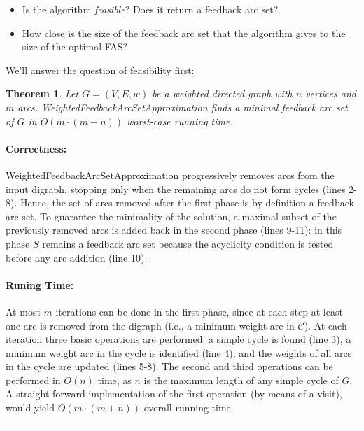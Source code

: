\documentclass{article}
\newtheorem{theorem}{Theorem}
\newenvironment{proof}{{\bf Proof:}}{\hfill\rule{2mm}{2mm}}
\begin{document}
\begin{itemize}
    \item Is the algorithm {\em feasible}? Does it return a feedback arc set?
    \item How close is the size of the feedback arc set that the algorithm gives to the size of the optimal FAS?
\end{itemize}

We'll answer the question of feasibility first:

\begin{theorem}
    Let $G = (V, E, w)$ be a weighted directed graph with $n$ vertices and $m$
arcs. {\sc WeightedFeedbackArcSetApproximation} finds a minimal feedback arc set of $G$ in $O(m\cdot (m+n))$ worst-case running time.  
\end{theorem}

\begin{proof}
\paragraph{Correctness:}
{\sc WeightedFeedbackArcSetApproximation} progressively removes arcs from the input digraph, stopping only when the remaining arcs do not form cycles (lines 2-8). Hence, the set of arcs removed after the first phase is by definition a feedback arc set. To guarantee the minimality of the solution, a maximal subset of the previously removed arcs is added back in the second phase (lines 9-11): in this phase $S$ remains a feedback arc set because the acyclicity condition is tested before any arc addition (line 10).

\paragraph{Runing Time:} At most $m$ iterations can be done in the first phase, since at each step at least one arc is removed from the digraph (i.e., a minimum weight arc in $\mathcal{C}$). At each iteration three basic operations are performed: a simple cycle is found (line 3), a minimum weight arc in the cycle is identified (line 4), and the weights of all arcs in the cycle are updated (lines 5-8). The second and third operations can be performed in $O(n)$ time, as $n$ is the maximum length of any simple cycle of $G$. A straight-forward implementation of the first operation (by means of a visit), would yield $O(m\cdot (m+n))$ overall running time.
\end{proof}
  \vspace{.5cm}
\end{document}
